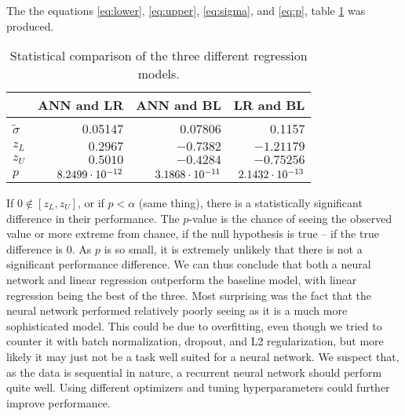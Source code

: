 The the equations \eqref{eq:lower}, \eqref{eq:upper}, \eqref{eq:sigma}, and \eqref{eq:p}, table \ref{tab:sig} was produced.
\begin{table}[H]
	\centering
	\begin{tabular}{l r r r}
		&ANN and LR	&ANN and BL&LR and BL	\\\hline
		$ \tilde{\sigma} $	&0.05147	&0.07806	&0.1157\\
		$ z_L $&$ 0.2967 $	&$ -0.7382 $	&$ -1.21179 $\\
		$ z_U $&$ 0.5010 $	&$ -0.4284 $	&$ -0.75256 $\\
		$ p $  &$ 8.2499\cdot10^{-12} $	&$ 3.1868\cdot10^{-11} $	&$ 2.1432\cdot10^{-13} $
	\end{tabular}
	\caption{Statistical comparison of the three different regression models.}\label{tab:sig}
\end{table}\noindent
If $ 0\notin[z_L, z_U] $, or if $ p<\alpha $ (same thing), there is a statistically significant difference in their performance.
The $ p $-value is the chance of seeing the observed value or more extreme from chance, if the null hypothesis is true -- if the true difference is 0.
As $ p $ is so small, it is extremely unlikely that there is not a significant performance difference.
We can thus conclude that both a neural network and linear regression outperform the baseline model, with linear regression being the best of the three.
Most surprising was the fact that the neural network performed relatively poorly seeing as it is a much more sophisticated model.
This could be due to overfitting, even though we tried to counter it with batch normalization, dropout, and L2 regularization, but more likely it may just not be a task well suited for a neural network.
We suspect that, as the data is sequential in nature, a recurrent neural network should perform quite well.
Using different optimizers and tuning hyperparameters could further improve performance.





















